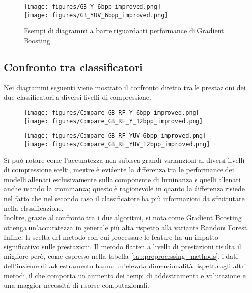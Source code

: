 \begin{figure}[H]
    \centering
    \texttt{[image: figures/GB\_Y\_6bpp\_improved.png]}\\[0.5cm]
    \texttt{[image: figures/GB\_YUV\_6bpp\_improved.png]}
    \caption{Esempi di diagrammi a barre riguardanti performance di Gradient Boosting}
    \label{fig:GB_YUV_plots}
\end{figure}
\subsection{Confronto tra classificatori}
Nei diagrammi seguenti viene mostrato il confronto diretto tra le prestazioni dei due classificatori a diversi livelli di compressione.
\begin{figure}[H]
    \centering
    \texttt{[image: figures/Compare\_GB\_RF\_Y\_6bpp\_improved.png]}\\[0.5cm]
    \texttt{[image: figures/Compare\_GB\_RF\_Y\_12bpp\_improved.png]}
\end{figure}

\begin{figure}[H]
    \centering
    \texttt{[image: figures/Compare\_GB\_RF\_YUV\_6bpp\_improved.png]}\\[0.5cm]
    \texttt{[image: figures/Compare\_GB\_RF\_YUV\_12bpp\_improved.png]}
\end{figure}
Si può notare come l'accuratezza non subisca grandi varianzioni ai diversi livelli di compressione scelti, mentre è evidente la differenza tra le performance dei modelli allenati esclusivamente sulla componente di luminanza e quelli allenati anche usando la crominanza; questo è ragionevole in quanto la differenza risiede nel fatto che nel secondo caso il classificatore ha più informazioni da sfruttutare nella classificazione.\\
Inoltre, grazie al confronto tra i due algoritmi, si nota come Gradient Boosting ottenga un'accuratezza in generale più alta rispetto alla variante Random Forest.\\
Infine, la scelta del metodo con cui processare le feature ha un impatto significativo sulle prestazioni. Il metodo flatten a livello di prestazioni risulta il migliore però, come espresso nella tabella \ref{tab:preprocessing_methods}, i dati dell'insieme di addestramento hanno un'elevata dimensionalità rispetto agli altri metodi, il che comporta un aumento dei tempi di addestramento e valutazione e una maggior necessità di risorse computazionali.
